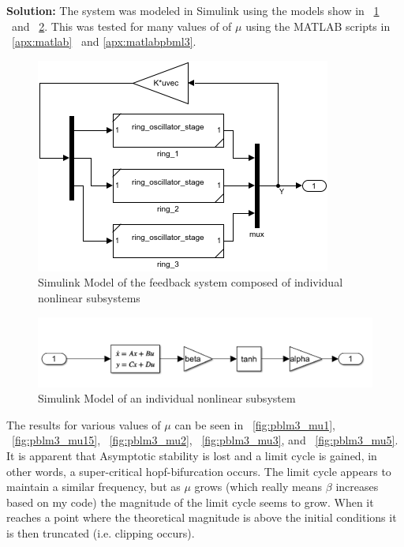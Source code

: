 \documentclass[letter]{article}
\begin{document}
\noindent
\textbf{Solution:}
The system was modeled in Simulink using the models show in \figurename \ \ref{fig:simmodelhw6pblm3} \ and \figurename \ \ref{fig:simmodelhw6pblm3subsystem}. This was tested for many values of of $\mu$ using the MATLAB scripts in \appendixname \ \ref{apx:matlab} \ and \ref{apx:matlabpbml3}.

\begin{figure}[h]
	\centering
	\includegraphics[width=0.7\linewidth]{fig/sim_model_HW6_pblm3}
	\caption{Simulink Model of the feedback system composed of individual nonlinear subsystems}
	\label{fig:simmodelhw6pblm3}
\end{figure}

\begin{figure}[h]
	\centering
	\includegraphics[width=0.7\linewidth]{fig/sim_model_HW6_pblm3_subsystem}
	\caption{Simulink Model of an individual nonlinear subsystem}
	\label{fig:simmodelhw6pblm3subsystem}
\end{figure}


The results for various values of $\mu$ can be seen in \figurename \  \ref{fig:pblm3_mu1}, \figurename \ \ref{fig:pblm3_mu15}, \figurename \ \ref{fig:pblm3_mu2}, \figurename \ \ref{fig:pblm3_mu3}, and \figurename \ \ref{fig:pblm3_mu5}. It is apparent that Asymptotic stability is lost and a limit cycle is gained, in other words, a super-critical hopf-bifurcation occurs. The limit cycle appears to maintain a similar frequency, but as $\mu$ grows (which really means $\beta$ increases based on my code) the magnitude of the limit cycle seems to grow. When it reaches a point where the theoretical magnitude is above the initial conditions it is then truncated (i.e. clipping occurs).
\end{document}
